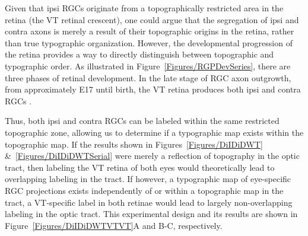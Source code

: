 Given that ipsi RGCs originate from a topographically restricted area in the retina (the VT retinal crescent), one could argue that the segregation of ipsi and contra axons is merely a result of their topographic origins in the retina, rather than true typographic organization.
However, the developmental progression of the retina provides a way to directly distinguish between topographic and typographic order.
As illustrated in Figure~\ref{Figures/RGPDevSeries}, there are three phases of retinal development.
In the late stage of RGC axon outgrowth, from approximately E17 until birth, the VT retina produces both ipsi and contra RGCs \cite{drager1985birth}.

Thus, both ipsi and contra RGCs can be labeled within the same restricted topographic zone, allowing us to determine if a typographic map exists within the topographic map.
If the results shown in Figures~\ref{Figures/DiIDiDWT} \&~\ref{Figures/DiIDiDWTSerial} were merely a reflection of topography in the optic tract, then labeling the VT retina of both eyes would theoretically lead to overlapping labeling in the tract.
If however, a typographic map of eye-specific RGC projections exists independently of or within a topographic map in the tract, a VT-specific label in both retinae would lead to largely non-overlapping labeling in the optic tract.
This experimental design and its results are shown in Figure~\ref{Figures/DiIDiDWTVTVT}A and B-C, respectively.

